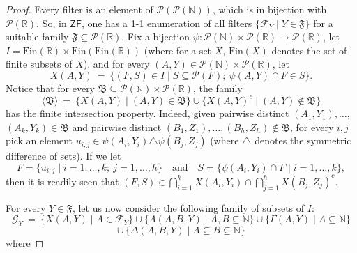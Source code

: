 \documentclass{amsart}
\theoremstyle{definition}
\theoremstyle{remark}
\def\F{\mathscr{F}}
\def\G{\mathscr{G}}
\def\BB{\mathfrak{B}}
\def\FF{\mathfrak{F}}
\def\N{\mathbb{N}}
\def\R{\mathbb{R}}
\begin{document}
\begin{proof}
Every filter is an element of $\mathcal{P}(\mathcal{P}(\N))$,
which is in bijection with $\mathcal{P}(\R)$.
So, in $\textsf{ZF}$, one has a 1-1 enumeration of 
all filters $\{\F_Y\mid Y\in\FF\}$ for a suitable family
$\FF\subseteq\mathcal{P}(\R)$.
Fix a bijection $\psi:\mathcal{P}(\N)\times\mathcal{P}(\R)\to\mathcal{P}(\R)$,
let $I=\text{Fin}(\R)\times\text{Fin}(\text{Fin}(\R))$ (where for a set $X$, $\text{Fin}(X)$ denotes the set of finite subsets of $X$),
and for every $(A,Y)\in \mathcal{P}(\N)\times\mathcal{P}(\R)$, let
$$X(A,Y)\ =\ \{(F,S)\in I\mid S\subseteq\mathcal{P}(F);\ \psi(A,Y)\cap F\in S\}.$$
Notice that for every 
$\BB\subseteq\mathcal{P}(\N)\times\mathcal{P}(\R)$,
the family
$$\langle\BB\rangle\ =\ 
\{X(A,Y)\mid (A,Y)\in\BB\}\cup\{X(A,Y)^c\mid (A,Y)\notin\BB\}$$
has the finite intersection property.
Indeed, given pairwise distinct $(A_1,Y_1),\ldots$, $(A_k,Y_k)\in\BB$ 
and pairwise distinct $(B_1,Z_1),\ldots,(B_h,Z_h)\notin\BB$, 
for every $i,j$ pick an element
$u_{i,j}\in \psi(A_i,Y_i)\triangle\psi(B_j,Z_j)$ 
(where $\triangle $ denotes the symmetric difference of sets).
If we let 
$$F=\{u_{i,j}\mid i=1,\ldots,k;\  j=1,\ldots,h\}\quad\text{and}\quad
S=\{\psi(A_i,Y_i)\cap F\mid i=1,\ldots,k\},$$ 
then it is readily seen that $(F,S)\in \bigcap_{i=1}^{k}X(A_i,Y_i)\cap
\bigcap_{j=1}^{h} X(B_j,Z_j)^c$.

For every $Y\in\FF$, let us now consider the following
family of subsets of $I$:
$$\G_Y\ =\ \{X(A,Y)\mid A\in\F_Y\}\cup
\{\Lambda(A,B,Y)\mid A,B\subseteq\N\}\cup
\{\Gamma(A,Y)\mid A\subseteq\N\}$$
$$\cup\,\{\Delta(A,B,Y)\mid A\subseteq B\subseteq\N\}$$
where


\end{proof}
\end{document}
